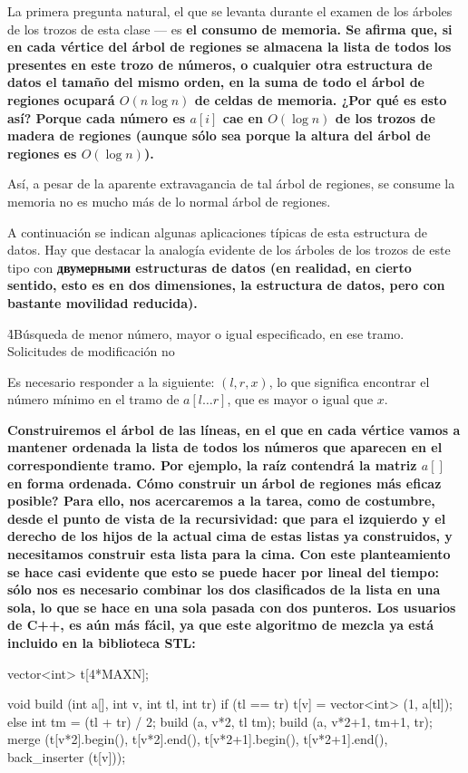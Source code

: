La primera pregunta natural, el que se levanta durante el examen de los árboles de los trozos de esta clase --- es \bf{el consumo de memoria}. Se afirma que, si en cada vértice del árbol de regiones se almacena la lista de todos los presentes en este trozo de números, o cualquier otra estructura de datos el tamaño del mismo orden, en la suma de todo el árbol de regiones ocupará $O (n \log n)$ de celdas de memoria. ¿Por qué es esto así? Porque cada número es $a[i]$ cae en $O (\log n)$ de los trozos de madera de regiones (aunque sólo sea porque la altura del árbol de regiones es $O (\log n)$).

Así, a pesar de la aparente extravagancia de tal árbol de regiones, se consume la memoria no es mucho más de lo normal árbol de regiones.

A continuación se indican algunas aplicaciones típicas de esta estructura de datos. Hay que destacar la analogía evidente de los árboles de los trozos de este tipo con \bf{двумерными estructuras de datos} (en realidad, en cierto sentido, esto es en dos dimensiones, la estructura de datos, pero con bastante movilidad reducida).

\h4{Búsqueda de menor número, mayor o igual especificado, en ese tramo. Solicitudes de modificación no}

Es necesario responder a la siguiente: $(l,r,x)$, lo que significa encontrar el número mínimo en el tramo de $a[l \ldots r]$, que es mayor o igual que $x$.

\bf{Construiremos} el árbol de las líneas, en el que en cada vértice vamos a mantener ordenada la lista de todos los números que aparecen en el correspondiente tramo. Por ejemplo, la raíz contendrá la matriz $a[]$ en forma ordenada. Cómo construir un árbol de regiones más eficaz posible? Para ello, nos acercaremos a la tarea, como de costumbre, desde el punto de vista de la recursividad: que para el izquierdo y el derecho de los hijos de la actual cima de estas listas ya construidos, y necesitamos construir esta lista para la cima. Con este planteamiento se hace casi evidente que esto se puede hacer por lineal del tiempo: sólo nos es necesario combinar los dos clasificados de la lista en una sola, lo que se hace en una sola pasada con dos punteros. Los usuarios de C++, es aún más fácil, ya que este algoritmo de mezcla ya está incluido en la biblioteca STL:

\code
vector<int> t[4*MAXN];

void build (int a[], int v, int tl, int tr) {
if (tl == tr)
t[v] = vector<int> (1, a[tl]);
else {
int tm = (tl + tr) / 2;
build (a, v*2, tl tm);
build (a, v*2+1, tm+1, tr);
merge (t[v*2].begin(), t[v*2].end(), t[v*2+1].begin(), t[v*2+1].end(),
back_inserter (t[v]));
}
}
\endcode

